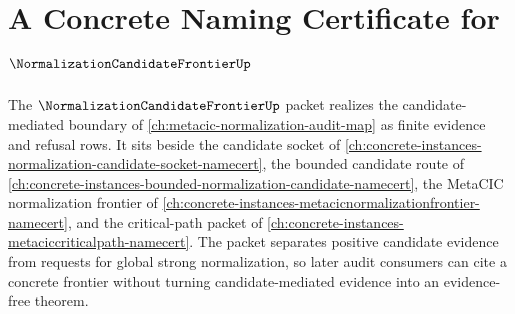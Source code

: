 \chapter{A Concrete Naming Certificate for $\NormalizationCandidateFrontierUp$}
\label{ch:concrete-instances-normalization-candidate-frontier-namecert}

The $\NormalizationCandidateFrontierUp$ packet realizes the candidate-mediated boundary of \autoref{ch:metacic-normalization-audit-map} as finite evidence and refusal rows. It sits beside the candidate socket of \autoref{ch:concrete-instances-normalization-candidate-socket-namecert}, the bounded candidate route of \autoref{ch:concrete-instances-bounded-normalization-candidate-namecert}, the MetaCIC normalization frontier of \autoref{ch:concrete-instances-metacicnormalizationfrontier-namecert}, and the critical-path packet of \autoref{ch:concrete-instances-metaciccriticalpath-namecert}. The packet separates positive candidate evidence from requests for global strong normalization, so later audit consumers can cite a concrete frontier without turning candidate-mediated evidence into an evidence-free theorem.

